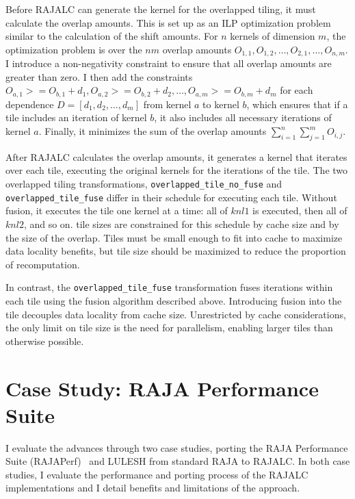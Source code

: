 Before RAJALC can generate the kernel for the overlapped tiling, it must
calculate the overlap amounts. 
This is set up as an ILP optimization problem similar to the calculation of the
shift amounts.
For $n$ kernels of dimension $m$, the optimization problem is over the $nm$
overlap amounts $O_{1,1},O_{1,2},\ldots,O_{2,1},\ldots,O_{n,m}$.
I introduce a non-negativity constraint to ensure that all overlap amounts
are greater than zero. 
I then add the constraints
$O_{a,1} >= O_{b,1} + d_{1}, O_{a,2} >= O_{b,2} + d_{2},\ldots,O_{a,m} >= O_{b,m} + d_{m}$
for each dependence $D=[d_{1},d_{2},\ldots,d_{m}]$ from kernel $a$ to kernel $b$,
which ensures that if a tile includes an iteration of kernel $b$, it also
includes all necessary iterations of kernel $a$.
Finally, it minimizes the sum of the overlap amounts
$\sum_{i=1}^{n} \sum_{j=1}^{m} O_{i,j}$.

After RAJALC calculates the overlap amounts, it generates a kernel that iterates
over each tile, executing the original kernels for the iterations of the tile.
The two overlapped tiling transformations, \verb.overlapped_tile_no_fuse.
and \verb.overlapped_tile_fuse. differ in their schedule for executing each
tile.
Without fusion, it executes the tile one kernel at a time: all of $knl1$ is
executed, then all of $knl2$, and so on. 
tile sizes are constrained for this schedule by cache size and by the size of
the overlap. 
Tiles must be small enough to fit into cache to maximize data locality
benefits, but tile size should be maximized to reduce the proportion of
recomputation.

In contrast, the \verb.overlapped_tile_fuse. transformation fuses iterations
within each tile using the fusion algorithm described above.
Introducing fusion into the tile decouples data locality from cache size.
Unrestricted by cache considerations, the only limit on tile size is the
need for parallelism, enabling larger tiles than otherwise possible.

\section{Case Study: RAJA Performance Suite}

I evaluate the advances through two case studies, porting the RAJA
Performance Suite (RAJAPerf)~\cite{hornung2017raja} and LULESH from
standard RAJA to RAJALC\@.
In both case studies, I evaluate the performance and porting process
of the RAJALC implementations and I detail benefits and limitations
of the approach.


